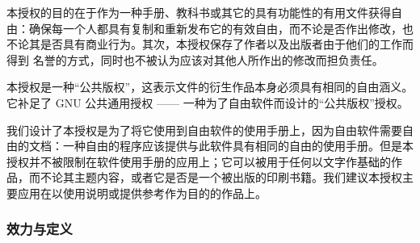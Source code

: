 本授权的目的在于作为一种手册、教科书或其它的具有功能性的有用文件获得自由：确保每一个人都具有复制和重新发布它的有效自由，而不论是否作出修改，也不论其是否具有商业行为。其次，本授权保存了作者以及出版者由于他们的工作而 得到 名誉的方式，同时也不被认为应该对其他人所作出的修改而担负责任。


本授权是一种``公共版权''，这表示文件的衍生作品本身必须具有相同的自由涵义。它补足了 GNU 公共通用授权 —— 一种为了自由软件而设计的``公共版权''授权。


我们设计了本授权是为了将它使用到自由软件的使用手册上，因为自由软件需要自由的文档：一种自由的程序应该提供与此软件具有相同的自由的使用手册。但是本授权并不被限制在软件使用手册的应用上；它可以被用于任何以文字作基础的作品，而不论其主题内容，或者它是否是一个被出版的印刷书籍。我们建议本授权主要应用在以使用说明或提供参考作为目的的作品上。


\subsubsection{效力与定义}


